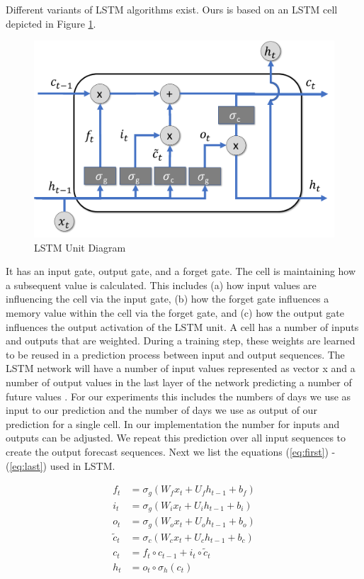 \documentclass[a4paper, inpress]{jds} %
\renewcommand{\_}{%
    \textunderscore\hspace{0pt}%
}
\begin{document}
Different variants of LSTM algorithms exist. Ours is based on an LSTM
cell depicted in Figure \ref{fig:lstm}.  

\begin{figure}[!htb]
    \centering
    \includegraphics[width=0.6\columnwidth]{images/lstm.pdf}
    \caption{LSTM Unit Diagram}
    \label{fig:lstm}
\end{figure}


It has an input gate, output
gate, and a forget gate. The cell is maintaining how a subsequent
value is calculated. This includes (a) how input values are
influencing the cell via the input gate, (b) how the forget gate
influences a memory value within the cell via the forget gate, and (c)
how the output gate influences the output activation of the LSTM
unit. A cell has a number of inputs and outputs that are
weighted. During a training step, these weights are learned to be
reused in a prediction process between input and output sequences.
The LSTM network will have a number of input values represented as vector x and a number of output values in the last layer of the network predicting a number of future values \citep{lstm-explained}. For our experiments this includes the numbers of days we use as input to our prediction and the number of days we use as output of our prediction for a single cell. In our implementation the number for inputs and outputs can be adjusted. We repeat this prediction over all input sequences to create the output forecast sequences. Next we list the equations (\ref{eq:first}) - (\ref{eq:last}) used in LSTM.

\newcommand{\RH}{\mathbb{R}^{H}}
\newcommand{\RD}{\mathbb{R}^{D}}
\begin{align}
    f_t &= \sigma_g(W_f x_t + U_f h_{t-1} + b_f) \label{eq:first} \\
    i_t &= \sigma_g(W_i x_t + U_i h_{t-1} + b_i) \\
    o_t &= \sigma_g(W_o x_t + U_o h_{t-1} + b_o) \\
    \tilde{c}_t &= \sigma_c(W_c x_t + U_c h_{t-1} + b_c) \\
    c_t &= f_t \circ c_{t-1} +i_t \circ \tilde{c}_t  \\
    h_t &= o_t \circ \sigma_h(c_t) \label{eq:last}
\end{align}
\end{document}
